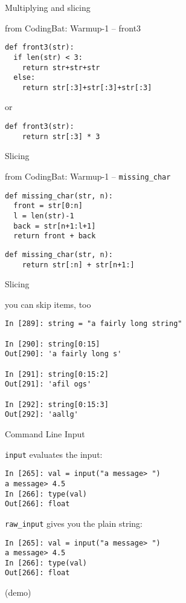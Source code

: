 \documentclass{beamer}
\begin{document}
\begin{frame}[fragile]{Multiplying and slicing}

{\Large from CodingBat: Warmup-1 -- front3}

\begin{verbatim}
def front3(str):
  if len(str) < 3:
    return str+str+str
  else:
    return str[:3]+str[:3]+str[:3]
\end{verbatim}

{\Large or}

\begin{verbatim}
def front3(str):
    return str[:3] * 3
\end{verbatim}

\end{frame} 

\begin{frame}[fragile]{Slicing}

{\Large from CodingBat: Warmup-1 -- \verb+missing_char+ }

\begin{verbatim}
def missing_char(str, n):
  front = str[0:n]
  l = len(str)-1
  back = str[n+1:l+1]
  return front + back
\end{verbatim}

\begin{verbatim}
def missing_char(str, n):
    return str[:n] + str[n+1:]
\end{verbatim}

\end{frame} 

\begin{frame}[fragile]{Slicing}

{\Large you can skip items, too}

\begin{verbatim}
In [289]: string = "a fairly long string"

In [290]: string[0:15]
Out[290]: 'a fairly long s'

In [291]: string[0:15:2]
Out[291]: 'afil ogs'

In [292]: string[0:15:3]
Out[292]: 'aallg'
\end{verbatim}

\end{frame} 

\begin{frame}[fragile]{Command Line Input}

{\Large \verb|input| evaluates the input:}
\begin{verbatim}
In [265]: val = input("a message> ")
a message> 4.5
In [266]: type(val)
Out[266]: float
\end{verbatim}

{\Large \verb|raw_input| gives you the plain string:}
\begin{verbatim}
In [265]: val = input("a message> ")
a message> 4.5
In [266]: type(val)
Out[266]: float
\end{verbatim}

\vfill
(demo)
\end{frame}
\end{document}
